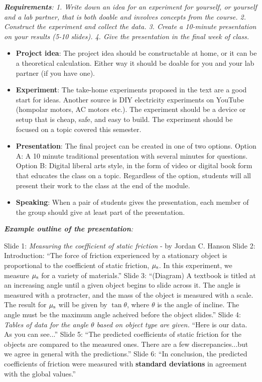 \documentclass[10pt]{article}
\begin{document}
\maketitle

\noindent
\textit{\textbf{Requirements}: 1. Write down an idea for an experiment for yourself, or yourself and a lab partner, that is both doable and involves concepts from the course.  2. Construct the experiment and collect the data.  3. Create a 10-minute presentation on your results (5-10 slides).  4. Give the presentation in the final week of class.} \\
\begin{itemize}
\item\textbf{Project idea}: The project idea should be constructable at home, or it can be a theoretical calculation.  Either way it should be doable for you and your lab partner (if you have one).
\item \textbf{Experiment}: The take-home experiments proposed in the text are a good start for ideas.  Another source is DIY electricity experiments on YouTube (hompolar motors, AC motors etc.). The experiment should be a device or setup that is cheap, safe, and easy to build.  The experiment should be focused on a topic covered this semester.
\item \textbf{Presentation}: The final project can be created in one of two options. Option A: A 10 minute traditional presentation with several minutes for questions. Option B: Digital liberal arts style, in the form of video or digital book form that educates the class on a topic. Regardless of the option, students will all present their work to the class at the
end of the module.
\item \textbf{Speaking}: When a pair of students gives the presentation, each member of the group should give at least part of the presentation.
\end{itemize}
\textit{\textbf{Example outline of the presentation}:}
\begin{outline}[enumerate]
\1 Slide 1: \textit{Measuring the coefficient of static friction} - by Jordan C. Hanson
\1 Slide 2: Introduction: ``The force of friction experienced by a stationary object is proportional to the coefficient of static friction, $\mu_{\rm s}$.  In this experiment, we measure $\mu_{\rm s}$ for a variety of materials.''
\1 Slide 3: ``(Diagram) A textbook is titled at an increasing angle until a given object begins to slide across it.  The angle is measured with a protracter, and the mass of the object is measured with a scale.  The result for $\mu_{\rm s}$ will be given by $\tan\theta$, where $\theta$ is the angle of incline.  The angle must be the maximum angle acheived before the object slides.''
\1 Slide 4: \textit{Tables of data for the angle $\theta$ based on object type are given.}  ``Here is our data.  As you can see...''
\1 Slide 5: ``The predicted coefficients of static friction for the objects are compared to the measured ones.  There are a few discrepancies...but we agree in general with the predictions.''
\1 Slide 6: ``In conclusion, the predicted coefficients of friction were measured with \textbf{standard deviations} in agreement with the global values.''
\end{outline}
\end{document}
